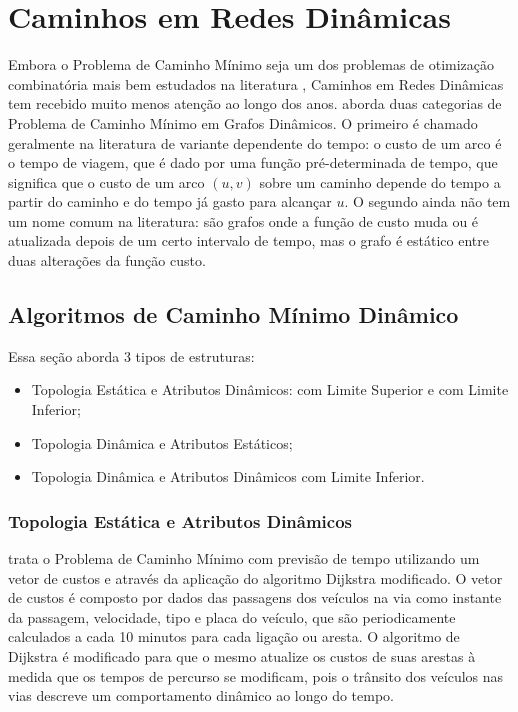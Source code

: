 \section{Caminhos em Redes Dinâmicas}
Embora o Problema de Caminho Mínimo seja um dos problemas de otimização combinatória mais bem estudados
na literatura \cite{bookahuja}, Caminhos em Redes Dinâmicas tem recebido muito menos atenção ao longo dos anos.
\cite{giacomo} aborda duas categorias de Problema de Caminho Mínimo em Grafos Dinâmicos. O primeiro é chamado
geralmente na literatura de variante dependente do tempo: o custo de um arco é o tempo de viagem, que é dado
por uma função pré-determinada de tempo, que significa que o custo de um arco $(u, v)$ sobre um caminho
depende do tempo a partir do caminho e do tempo já gasto para alcançar $u$.
O segundo ainda não tem um nome comum na literatura: são grafos onde a função de custo muda ou é atualizada
depois de um certo intervalo de tempo, mas o grafo é estático entre duas alterações da função custo.

\subsection{Algoritmos de Caminho Mínimo Dinâmico}
Essa seção aborda 3 tipos de estruturas:
\begin{itemize}
\item Topologia Estática e Atributos Dinâmicos: com Limite Superior \cite{leonard} e com Limite Inferior;
\item Topologia Dinâmica e Atributos Estáticos;
\item Topologia Dinâmica e Atributos Dinâmicos com Limite Inferior.
\end{itemize}

\subsubsection{Topologia Estática e Atributos Dinâmicos}
\cite{leonard} trata o Problema de Caminho Mínimo com previsão de tempo utilizando um vetor de custos e
através da aplicação do algoritmo Dijkstra modificado. O vetor de custos é composto por dados das passagens 
dos veículos na via como instante da passagem, velocidade, tipo e placa do veículo, que são periodicamente calculados
a cada 10 minutos para cada ligação ou aresta. O algoritmo de Dijkstra é modificado para que o mesmo atualize os custos
de suas arestas à medida que os tempos de percurso se modificam, pois o trânsito dos veículos nas vias descreve um
comportamento dinâmico ao longo do tempo.

